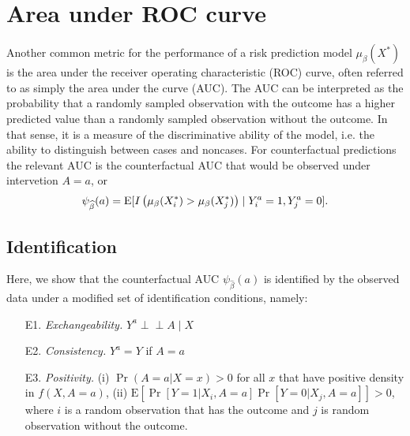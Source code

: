 \section{Area under ROC curve}\label{sec:auc}
Another common metric for the performance of a risk prediction model $\mu_\beta(X^*)$ is the area under the receiver operating characteristic (ROC) curve, often referred to as simply the area under the curve (AUC). The AUC can be interpreted as the probability that a randomly sampled observation with the outcome has a higher predicted value than a randomly sampled observation without the outcome. In that sense, it is a measure of the discriminative ability of the model, i.e. the ability to distinguish between cases and noncases. For counterfactual predictions the relevant AUC is the counterfactual AUC that would be observed under intervetion $A=a$, or
\begin{equation}\label{eqn:auc_estimand}
    \psi_{\widehat{\beta}}(a) = \operatorname{E}[I\left(\mu_\beta(X^*_i) > \mu_\beta(X^*_j)\right) \mid Y_i^a = 1, Y_j^a = 0].
\end{equation}

\subsection{Identification}
Here, we show that the counterfactual AUC $\psi_{\widehat{\beta}}(a)$ is identified by the observed data under a modified set of identification conditions, namely:
\begin{enumerate}
    \item[E1.] \textit{Exchangeability.} $Y^a \perp\!\!\!\perp A \mid X$ 
    \item[E2.] \textit{Consistency.} $Y^a = Y$ if $A = a$
    \item[E3.] \textit{Positivity.} (i) $\Pr(A = a | X = x) > 0$ for all $x$ that have positive density in $f(X, A = a)$, (ii) $\mathrm{E}\left[\Pr[Y = 1 | X_i, A = a]\Pr[Y = 0 | X_j, A = a]\right] > 0 $, where $i$ is a random observation that has the outcome and $j$ is random observation without the outcome.
\end{enumerate}


